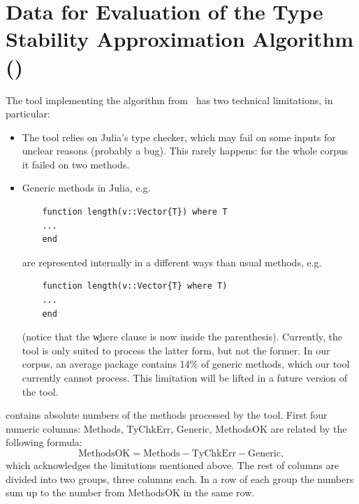 \chapter[Data for Evaluation of the Type Stability Approximation Algorithm]{%
  Data for Evaluation of the Type Stability Approximation Algorithm ()}%
\label{app:approx}

The tool implementing the algorithm from~ has two
technical limitations, in particular:

\begin{itemize}
  \item The tool relies on Julia's type checker, which may fail on some inputs
  for unclear reasons (probably a bug). This rarely happens: for the whole
  corpus it failed on two methods.

  \item Generic methods in Julia, e.g.
  \begin{lstlisting}
    function length(v::Vector{T}) where T
    ...
    end
  \end{lstlisting}
  are represented internally in a different ways than usual methods, e.g.
  \begin{lstlisting}
    function length(v::Vector{T} where T)
    ...
    end
  \end{lstlisting}
  (notice that the \c{where} clause is now inside the parenthesis).
  Currently, the tool is only suited to process the latter form, but not the
  former. In our corpus, an average package contains 14\% of generic methods,
  which our tool currently cannot process. This limitation will be lifted in a
  future version of the tool.
\end{itemize}

 contains absolute numbers of the methods processed
by the tool. First four numeric columns: Methods, TyChkErr, Generic, MethodsOK
are related by the following formula:
\begin{equation*}
\text{MethodsOK} = \text{Methods} - \text{TyChkErr} - \text{Generic},
\end{equation*}
which acknowledges the limitations mentioned above. The rest of columns are
divided into two groups, three columns each. In a row of each group the numbers
sum up to the number from MethodsOK in the same row.


